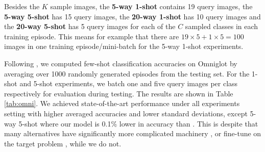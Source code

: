 \documentclass[10pt,twocolumn,letterpaper]{article}
\begin{document}
Besides the $K$ sample images, the \textbf{5-way 1-shot} contains 19 query images, the \textbf{5-way 5-shot} has 15 query images, the \textbf{20-way 1-shot} has 10 query images and the \textbf{20-way 5-shot} has 5 query images for each of the $C$ sampled classes in each training episode. This means for example that there are  $19 \times 5 + 1 \times 5 = 100$ images in one training episode/mini-batch for the 5-way 1-shot experiments.  



Following \cite{snell2017prototypical}, we computed few-shot classification accuracies on Omniglot by averaging over 1000 randomly generated episodes from the testing set. 
For the 1-shot and 5-shot experiments, we batch one and five query images per class respectively for evaluation during testing.
The results are shown in Table \ref{tab:omni}. We achieved state-of-the-art performance under all experiments setting with higher averaged accuracies and lower standard deviations, except 5-way 5-shot where our model is 0.1\% lower in accuracy than \cite{finn2017model}. This is despite that many alternatives have significantly more complicated machinery \cite{munkhdalai2017meta,edwards2016towards}, or fine-tune on the target problem \cite{finn2017model,vinyals2016matching},  while we do not.
\end{document}
